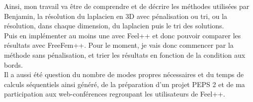 Ainsi, mon travail va être de comprendre et de décrire les méthodes utilisées par Benjamin, la résolution du laplacien en 3D avec pénalisation ou tri, ou la résolution, dans chaque dimension, du laplacien puis le tri des solutions.\\
Puis en implémenter au moins une avec Feel++ et donc pouvoir comparer les résultats avec FreeFem++. Pour le moment, je vais donc commencer par la méthode sans pénalisation, et trier les résultats en fonction de la condition aux bords.\\
Il a aussi été question du nombre de modes propres nécessaires et du temps de calculs séquentiels ainsi généré, de la préparation d'un projet PEPS 2 et de ma participation aux web-conférences regroupant les utilisateurs de Feel++.

